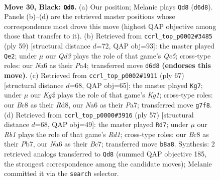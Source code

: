 \documentclass[11pt]{article}
\begin{document}
\clearpage

\begin{figure}[p]\centering
\begin{subfigure}{0.46\textwidth}\centering
\resizebox{\linewidth}{!}{%
\newchessgame
\chessboard[
  setfen={1rb5/pp4k1/n2q2p1/2pP2pp/8/PB1Q1PP1/1P2RK1P/2R5 b - - 0 30},
  showmover=false,
  pgfstyle=straightmove, color=movearrow, markmove={d6-d8}
]}
\caption{}
\end{subfigure}\hfill
\begin{subfigure}{0.46\textwidth}\centering
\resizebox{\linewidth}{!}{%
\newchessgame
\chessboard[
  setfen={5r2/2p2k1p/3b2pP/3p1p2/p1qP4/2P1P3/P1QB1PP1/1R4K1 b - - 4 30},
  showmover=false,
  pgfstyle=straightmove, color=movearrow, markmove={c4-e2}
]}
\caption{}
\end{subfigure}
\\[4pt]
\begin{subfigure}{0.46\textwidth}\centering
\resizebox{\linewidth}{!}{%
\newchessgame
\chessboard[
  setfen={3r2k1/p1r2p2/4p2p/R1P1qnp1/1P1p4/3Q3P/3B1PP1/1R4K1 b - - 0 34},
  showmover=false,
  pgfstyle=straightmove, color=movearrow, markmove={g8-g7}
]}
\caption{}
\end{subfigure}\hfill
\begin{subfigure}{0.46\textwidth}\centering
\resizebox{\linewidth}{!}{%
\newchessgame
\chessboard[
  setfen={3r2k1/ppb2p2/5qp1/P2p4/3P1pP1/2Q4P/1P3PB1/R5K1 b - - 1 29},
  showmover=false,
  pgfstyle=straightmove, color=movearrow, markmove={d8-d7}
]}
\caption{}
\end{subfigure}
\caption{\textbf{Move 30, Black: \texttt{Qd8}.} (a) Our position; Melanie plays \texttt{Qd8} (\texttt{d6d8}). Panels (b)--(d) are the retrieved master positions whose correspondence most drove this move (highest QAP objective among those that transfer to it). (b) Retrieved from \texttt{ccrl\_top\_p0002\#3485} (ply 59) [structural distance $d$=72, QAP obj=93]: the master played \texttt{Qe2}; under $\mu$ our \emph{Qd3} plays the role of that game's \emph{Qc5}; cross-type roles: our \emph{N}a6 as their \emph{P}a4; transferred move \texttt{d6d8} \textbf{(endorses this move)}. (c) Retrieved from \texttt{ccrl\_top\_p0002\#1911} (ply 67) [structural distance $d$=68, QAP obj=65]: the master played \texttt{Kg7}; under $\mu$ our \emph{Kg2} plays the role of that game's \emph{Kg1}; cross-type roles: our \emph{B}c8 as their \emph{R}d8, our \emph{N}a6 as their \emph{P}a7; transferred move \texttt{g7f8}. (d) Retrieved from \texttt{ccrl\_top\_p0000\#3916} (ply 57) [structural distance $d$=68, QAP obj=49]: the master played \texttt{Rd7}; under $\mu$ our \emph{Rb1} plays the role of that game's \emph{Rd1}; cross-type roles: our \emph{B}c8 as their \emph{P}b7, our \emph{N}a6 as their \emph{B}c7; transferred move \texttt{b8a8}. Synthesis: 2 retrieved analogs transferred to \texttt{Qd8} (summed QAP objective 185, the strongest correspondence among the candidate moves); Melanie committed it via the \texttt{search} selector.}
\label{fig:thought-m59}
\end{figure}
\end{document}
